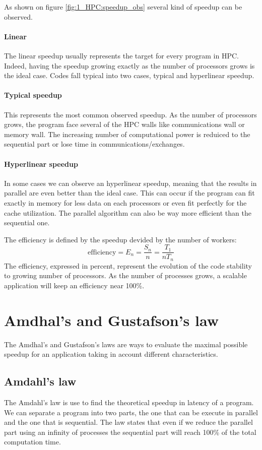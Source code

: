 	As shown on figure \ref{fig:1_HPC:speedup_obs} several kind of speedup can be observed. 
	\paragraph{Linear}
	The linear speedup usually represents the target for every program in HPC. 
	Indeed, having the speedup growing exactly as the number of processors grows is the ideal case. 
	Codes fall typical into two cases, typical and hyperlinear speedup. 
	\paragraph{Typical speedup}
	This represents the most common observed speedup. 
	As the number of processors grows, the program face several of the HPC walls like communications wall or memory wall. 
	The increasing number of computational power is reduiced to the sequential part or lose time in communications/exchanges. 
	\paragraph{Hyperlinear speedup}
	In some cases we can observe an hyperlinear speedup, meaning that the results in parallel are even better than the ideal case. 
	This can occur if the program can fit exactly in memory for less data on each processors or even fit perfectly for the cache utilization. 
	The parallel algorithm can also be way more efficient than the sequential one. 

	The efficiency is defined by the speedup devided by the number of workers: 
	\begin{equation}
	\text{efficiency} = E_n = \frac{S_n}{n} = \frac{T_1}{nT_n}
	\end{equation}
	The efficiency, expressed in percent, represent the evolution of the code stability to growing number of processors. 
	As the number of processes grows, a scalable application will keep an efficiency near 100\%.

	\section{Amdhal's and Gustafson's law}
	The Amdhal's and Gustafson's laws are ways to evaluate the maximal possible speedup for an application taking in account different characteristics. 

	\subsection{Amdahl's law}
	The Amdahl's law\cite{amdahl1967validity} is use to find the theoretical speedup in latency of a program.
	We can separate a program into two parts, the one that can be execute in parallel and the one that is sequential. 
	The law states that even if we reduce the parallel part using an infinity of processes the sequential part will reach 100\% of the total computation time. 

